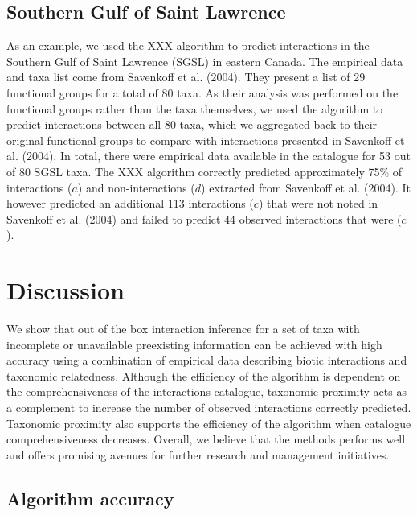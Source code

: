 \documentclass[letterpaper]{article}
\begin{document}
    \subsection{Southern Gulf of Saint Lawrence}
As an example, we used the XXX algorithm to predict interactions in the Southern Gulf of Saint Lawrence (SGSL) in eastern Canada. The empirical data and taxa list come from Savenkoff et al. (2004). They present a list of 29 functional groups for a total of 80 taxa. As their analysis was performed on the functional groups rather than the taxa themselves, we used the algorithm to predict interactions between all 80 taxa, which we aggregated back to their original functional groups to compare with interactions presented in Savenkoff et al. (2004). In total, there were empirical data available in the catalogue for 53 out of 80 SGSL taxa. The XXX algorithm correctly predicted approximately 75\% of interactions ($a$) and non-interactions ($d$) extracted from Savenkoff et al. (2004). It however predicted an additional 113 interactions ($c$) that were not noted in Savenkoff et al. (2004) and failed to predict 44 observed interactions that were ($c$).



\section{Discussion}
We show that out of the box interaction inference for a set of taxa with incomplete or unavailable preexisting information can be achieved with high accuracy using a combination of empirical data describing biotic interactions and taxonomic relatedness. Although the efficiency of the algorithm is dependent on the comprehensiveness of the interactions catalogue, taxonomic proximity acts as a complement to increase the number of observed interactions correctly predicted. Taxonomic proximity also supports the efficiency of the algorithm when catalogue comprehensiveness decreases. Overall, we believe that the methods performs well and offers promising avenues for further research and management initiatives.

\subsection{Algorithm accuracy}
\end{document}
